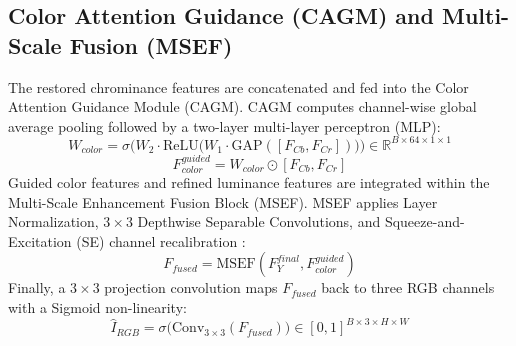 \documentclass[10pt,twocolumn,letterpaper]{article}
\begin{document}
\subsection{Color Attention Guidance (CAGM) and Multi-Scale Fusion (MSEF)}
The restored chrominance features are concatenated and fed into the Color Attention Guidance Module (CAGM). CAGM computes channel-wise global average pooling followed by a two-layer multi-layer perceptron (MLP):
\begin{equation}
W_{color} = \sigma\Big( W_2 \cdot \text{ReLU}\big( W_1 \cdot \text{GAP}([F_{Cb}, F_{Cr}]) \big) \Big) \in \mathbb{R}^{B \times 64 \times 1 \times 1}
\end{equation}
\begin{equation}
F_{color}^{guided} = W_{color} \odot [F_{Cb}, F_{Cr}]
\end{equation}
Guided color features and refined luminance features are integrated within the Multi-Scale Enhancement Fusion Block (MSEF). MSEF applies Layer Normalization, $3\times3$ Depthwise Separable Convolutions, and Squeeze-and-Excitation (SE) channel recalibration \cite{hu2018squeeze}:
\begin{equation}
F_{fused} = \text{MSEF}(F_Y^{final}, F_{color}^{guided})
\end{equation}
Finally, a $3\times3$ projection convolution maps $F_{fused}$ back to three RGB channels with a Sigmoid non-linearity:
\begin{equation}
\hat{I}_{RGB} = \sigma\big( \text{Conv}_{3\times3}(F_{fused}) \big) \in [0, 1]^{B \times 3 \times H \times W}
\end{equation}
\end{document}

